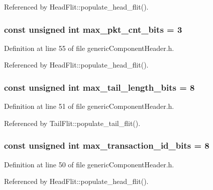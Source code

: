 Referenced by HeadFlit::populate\_\-head\_\-flit().
\subsubsection[{max\_\-pkt\_\-cnt\_\-bits}]{\setlength{\rightskip}{0pt plus 5cm}const unsigned int {\bf max\_\-pkt\_\-cnt\_\-bits} = 3}\label{genericComponentHeader_8h_3c6f8fc634796e799dfe8c3d848abd40}




Definition at line 55 of file genericComponentHeader.h.

Referenced by HeadFlit::populate\_\-head\_\-flit().
\subsubsection[{max\_\-tail\_\-length\_\-bits}]{\setlength{\rightskip}{0pt plus 5cm}const unsigned int {\bf max\_\-tail\_\-length\_\-bits} = 8}\label{genericComponentHeader_8h_5865e4b460e585b9a53f2dfa6a5839ae}




Definition at line 51 of file genericComponentHeader.h.

Referenced by TailFlit::populate\_\-tail\_\-flit().
\subsubsection[{max\_\-transaction\_\-id\_\-bits}]{\setlength{\rightskip}{0pt plus 5cm}const unsigned int {\bf max\_\-transaction\_\-id\_\-bits} = 8}\label{genericComponentHeader_8h_df297dfc5bd1387de6bec325bfa30f23}




Definition at line 50 of file genericComponentHeader.h.

Referenced by HeadFlit::populate\_\-head\_\-flit().